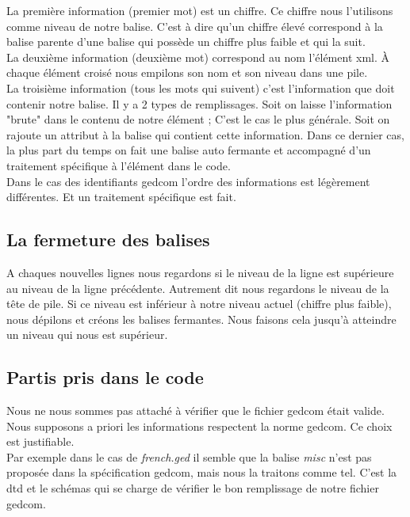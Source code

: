 \documentclass[12pt,a4paper]{article}
\begin{document}
La première information (premier mot) est un chiffre. Ce chiffre nous l'utilisons
comme niveau de notre balise. C'est à dire qu'un chiffre élevé correspond à la
balise parente d'une balise qui possède un chiffre plus faible et qui la suit.\\

La deuxième information (deuxième mot) correspond au nom l'élément xml.
À chaque élément croisé nous empilons son nom et son niveau dans une pile.\\

La troisième information (tous les mots qui suivent) c'est l'information 
que doit contenir notre balise. Il y a 2 types de remplissages. Soit on laisse
l'information "brute" dans le contenu de notre élément ; C'est le cas le plus
générale. Soit on rajoute un attribut à la balise qui contient cette
information. Dans ce dernier cas, la plus part du temps on fait une balise auto
fermante et accompagné d'un traitement spécifique à l'élément dans le code.\\

Dans le cas des identifiants gedcom l'ordre des informations est légèrement
différentes. Et un traitement spécifique est fait.

\subsection{La fermeture des balises}

A chaques nouvelles lignes nous regardons si le niveau de la ligne est supérieure 
au niveau de la ligne précédente. Autrement dit nous regardons le niveau de la
tête de pile. Si ce niveau est inférieur à notre niveau actuel (chiffre plus
faible), nous dépilons et créons les balises fermantes. Nous faisons cela 
jusqu'à atteindre un niveau qui nous est supérieur.

\subsection{Partis pris dans le code}

Nous ne nous sommes pas attaché à vérifier que le fichier gedcom était valide.
Nous supposons a priori les informations respectent la norme gedcom. Ce 
choix est justifiable.\\
Par exemple dans le cas de \emph{french.ged} il semble que la balise \emph{misc} n'est pas 
proposée dans la spécification gedcom, mais nous la traitons comme tel.
C'est la dtd et le schémas qui se charge de vérifier le bon remplissage de
notre fichier gedcom.
\end{document}
